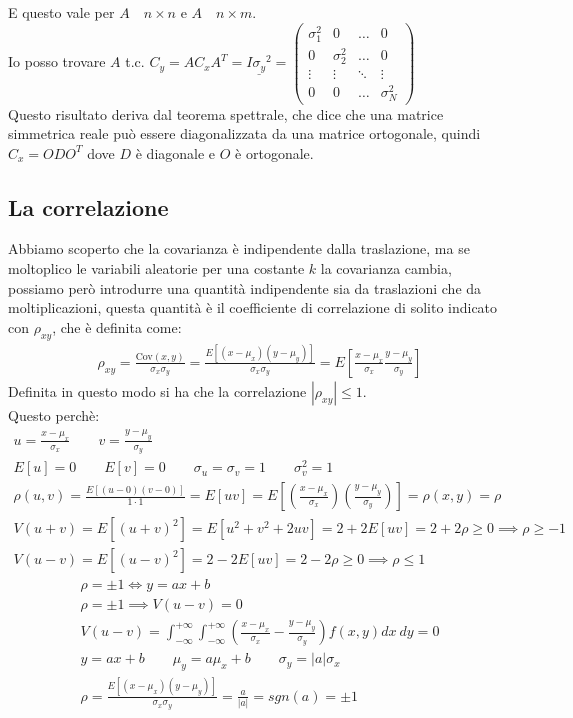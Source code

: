 \documentclass[a4paper, oneside]{article}
\begin{document}
E questo vale per $A \quad n\times n$ e $A \quad n\times m$.\\
Io posso trovare $A$ t.c. $C_y = A C_x A^T = I \underline{\sigma_y}^2 = \begin{pmatrix}
        \sigma_1^2 & 0 & \dots & 0\\
        0 & \sigma_2^2 & \dots & 0\\
        \vdots & \vdots & \ddots & \vdots\\
        0 & 0 & \dots & \sigma_N^2
\end{pmatrix}$  \\
Questo risultato deriva dal teorema spettrale, che dice che una matrice simmetrica reale può essere diagonalizzata da una matrice ortogonale, quindi $C_x = O D O^T$ dove $D$ è diagonale e $O$ è ortogonale.\\

\subsection{La correlazione}
Abbiamo scoperto che la covarianza è indipendente dalla traslazione, ma se moltoplico le variabili aleatorie per una costante $k$ la covarianza cambia, possiamo però introdurre una quantità indipendente sia da traslazioni che da moltiplicazioni, questa quantità è il coefficiente di correlazione di solito indicato con $\rho_{xy}$, che è definita come:
\begin{gather*}
    \rho_{xy} = \frac{\text{Cov}(x,y)}{\sigma_x \sigma_y} = \frac{E[(x - \mu_x)(y - \mu_y)]}{\sigma_x \sigma_y} = E\left[ \frac{x - \mu_x}{\sigma_x} \frac{y - \mu_y}{\sigma_y} \right] 
\end{gather*}
Definita in questo modo si ha che la correlazione $|\rho_{xy}| \leq 1$.\\
Questo perchè:
\begin{gather*}
    u = \frac{x - \mu_x}{\sigma_x} \qquad v = \frac{y - \mu_y}{\sigma_y} \\
    E[u] = 0 \qquad E[v] = 0 \qquad \sigma_u = \sigma_v = 1 \qquad \sigma_v^2 = 1\\
    \rho(u,v) = \frac{E[(u - 0)(v - 0)]}{1 \cdot 1} = E[uv] = E\left[ \left( \frac{x-\mu_x}{\sigma_x} \right) \left( \frac{y - \mu_y}{\sigma_y} \right) \right] = \rho(x,y) = \rho\\
    V(u+v) = E[(u+v)^2] = E[u^2 + v^2 + 2uv] = 2+2 E[uv] = 2 + 2\rho \geq 0 \implies \rho \geq -1 \\
    V(u-v) = E[(u-v)^2] = 2-2 E[uv] = 2 - 2\rho \geq 0 \implies \rho \leq 1
\end{gather*}
\begin{gather*}
    \rho = \pm 1 \Leftrightarrow y = ax + b\\
    \rho = \pm 1 \implies V(u - v) = 0 \\
    V(u - v) = \int_{-\infty}^{+\infty} \int_{-\infty}^{+\infty} \left( \frac{x - \mu_x}{\sigma_x} - \frac{y - \mu_y}{\sigma_y} \right) f(x,y) dx \ dy = 0 \\
    y = ax + b \qquad \mu_y = a\mu_x + b \qquad \sigma_y = |a| \sigma_x\\
    \rho = \frac{E[(x- \mu_x) (y - \mu_y)]}{\sigma_x \sigma_y} = \frac{a}{|a|} = sgn(a) = \pm 1
\end{gather*}
\end{document}
